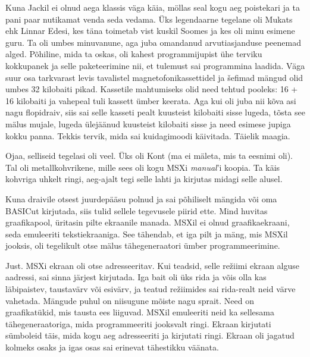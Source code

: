 Kuna Jackil ei olnud aega klassis väga käia,
möllas seal kogu aeg poistekari ja ta pani paar nutikamat venda 
seda vedama. Üks legendaarne tegelane oli 
Mukats ehk Linnar Edesi, kes täna toimetab vist kuskil Soomes ja kes oli minu esimene 
guru. Ta oli umbes minuvanune, aga juba omandanud 
arvutiasjanduse peenemad alged. Põhiline, mida ta oskas, oli kahest 
programmijupist ühe terviku kokkupanek ja selle paketeerimine nii, et 
tulemust sai programmina laadida.
Väga suur osa tarkvarast levis tavalistel magnetofonikassettidel ja 
šefimad mängud olid umbes 32 kilobaiti pikad. 
Kassetile mahtumiseks olid need tehtud pooleks: 16 + 16 
kilobaiti ja vahepeal tuli kassett ümber keerata. Aga kui oli juba nii kõva asi 
nagu 
flopidraiv, siis sai selle kasseti pealt kuusteist kilobaiti sisse lugeda, 
tõsta 
see mälus mujale, lugeda ülejäänud kuusteist kilobaiti sisse ja need esimese 
jupiga 
kokku panna. Tekkis tervik, mida sai kuidagimoodi käivitada. 
Täielik maagia. 


Ojaa, selliseid tegelasi oli veel. Üks oli 
Kont (ma ei mäleta, mis ta eesnimi oli). Tal oli 
metallkohvrikene, mille sees oli kogu MSXi \emph{manual}'i koopia. Ta käis 
kohvriga uhkelt ringi, aeg-ajalt tegi 
selle lahti ja kirjutas midagi selle alusel.

Kuna draivile otsest juurdepääsu polnud ja sai põhiliselt 
mängida või oma BASICut kirjutada, siis tulid sellele 
tegevusele piirid ette. Mind huvitas graafikapool, 
üritasin pilte ekraanile manada. MSXil ei olnud 
graafikaekraani, seda emuleeriti tekstiekraaniga. See tähendab, et
iga pilt ja mäng, mis MSXil jooksis, oli 
tegelikult otse mälus tähe{\-}generaatori ümber programmeerimine. 


Just. MSXi ekraan oli otse adresseeritav. Kui 
teadsid, selle režiimi ekraan alguse aadressi, sai sinna järjest kirjutada. 
Iga bait 
oli üks rida ja võis olla kas läbipaistev, taustavärv või esivärv, ja teatud
režiimides sai rida-realt neid värve vahetada. 
Mängude puhul on niisugune mõiste nagu sprait. Need on graafikatükid, mis 
tausta ees liiguvad. MSXil 
emuleeriti neid ka sellesama tähegeneraatoriga, mida programmeeriti jooksvalt 
ringi. 
Ekraan kirjutati sümboleid täis, mida kogu aeg adresseeriti ja 
kirjutati ringi. Ekraan oli jagatud kolmeks osaks ja igas osas sai erinevat 
tähestikku väänata.

